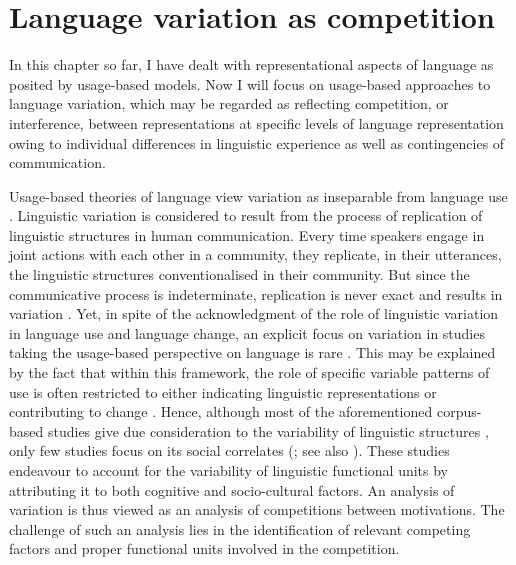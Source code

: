 \section{Language variation as competition}\label{sec:var}
In this chapter so far, I have dealt with representational aspects of language as posited by usage-based models. Now I will focus on usage-based approaches to language variation, which may be regarded as reflecting competition, or interference, between representations at specific levels of language representation owing to individual differences in linguistic experience as well as contingencies of communication.

Usage-based theories of language view variation as inseparable from language use \citep[9]{five-graces}. Linguistic variation is considered to result from the process of replication of linguistic structures in human communication. Every time speakers engage in joint actions with each other in a community, they replicate, in their utterances, the linguistic structures conventionalised in their community. But since the communicative process is indeterminate, replication is never exact and results in variation \citep[cf.][]{paul,croft2000,five-graces,poplack-cacoullos}. Yet, in spite of the acknowledgment of the role of linguistic variation in language use and language change, an explicit focus on variation in studies taking the usage-based perspective on language is rare \citep[cf.][]{poplack-cacoullos}. This may be explained by the fact that within this framework, the role of specific variable patterns of use is often restricted to either indicating linguistic representations or contributing to change \citep[cf.][7]{five-graces}. Hence, although most of the aforementioned corpus-based studies give due consideration to the variability of linguistic structures \citep[e.g.,][]{bybee-scheibman,kapatsinski2005,schaefer2014,schneider2014}, only few studies focus on its social correlates (\citealt[e.g.,][]{keune-etal2005}; see also \citealt{lorenz2014,zenner-etal2014,verhagen-etal-2018}). These studies endeavour to account for the variability of linguistic functional units by attributing it to both cognitive and socio-cultural factors. An analysis of variation is thus viewed as an analysis of competitions between motivations. The challenge of such an analysis lies in the identification of relevant competing factors and proper functional units involved in the competition.

